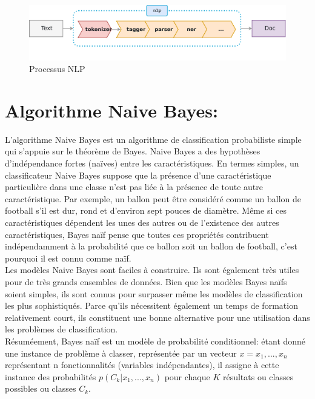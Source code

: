\begin{figure}[H]
    \centering
    \includegraphics[width=\textwidth]{chapitre2/assets/nlp1.png}
    \caption{Processus NLP}
    \label{fig:my_label}
\end{figure}

\section{Algorithme Naive Bayes:}
L'algorithme Naive Bayes est un algorithme de classification probabiliste simple qui s'appuie sur le théorème de Bayes. Naive Bayes a des hypothèses d'indépendance fortes (naïves) entre les caractéristiques. En termes simples, un classificateur Naive Bayes suppose que la présence d'une caractéristique particulière dans une classe n'est pas liée à la présence de toute autre caractéristique. Par exemple, un ballon peut être considéré comme un ballon de football s'il est dur, rond et d'environ sept pouces de diamètre. Même si ces caractéristiques dépendent les unes des autres ou de l'existence des autres caractéristiques, Bayes naïf pense que toutes ces propriétés contribuent indépendamment à la probabilité que ce ballon soit un ballon de football, c'est pourquoi il est connu comme naïf. \\

Les modèles Naive Bayes sont faciles à construire. Ils sont également très utiles pour de très grands ensembles de données. Bien que les modèles Bayes naïfs soient simples, ils sont connus pour surpasser même les modèles de classification les plus sophistiqués. Parce qu'ils nécessitent également un temps de formation relativement court, ils constituent une bonne alternative pour une utilisation dans les problèmes de classification. \\

Résuméement, Bayes naïf est un modèle de probabilité conditionnel: étant donné une instance de problème à classer, représentée par un vecteur $x=x_{1},...,x_{n}$  représentant n fonctionnalités (variables indépendantes), il assigne à cette instance des probabilités ${p(C_{k}| x_{1},...,x_{n})}$ pour chaque $K$ résultats ou classes possibles ou classes $C_{k}$. \cite{murty2011pattern} \\

